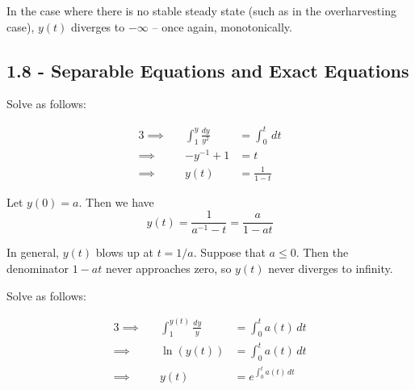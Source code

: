 \documentclass[a4paper]{article}
\begin{document}
In the case where there is no stable steady state (such as in the overharvesting case), \(y \!\left( t \right) \) diverges to \(-\infty\) -- once again, monotonically. 

\newpage
\subsection{\textsf{1.8 - Separable Equations and Exact Equations}}

Solve as follows:

\begin{alignat*}{3}
	\implies &&\int^{y}_{1} \frac{dy}{y^{2}} & = \int^{t}_{0}  \, dt  \\
	\implies && -y^{-1} + 1 & = t \\ 
	\implies && y \!\left( t \right) & = \frac{1}{1 - t}
\end{alignat*}


Let \(y \!\left( 0 \right) = a\). Then we have
\[
	y \!\left( t \right) = \frac{1}{a^{-1} - t} = \frac{a}{1 - at}
\]

In general, \(y \!\left( t \right) \) blows up at \(t = 1/a\). Suppose that \(a \le 0\). Then the denominator \(1 - at\) never approaches zero, so \(y \!\left( t \right) \) never diverges to infinity.

\vspace{12pt}


Solve as follows:

\begin{alignat*}{3}
	\implies &&\int^{y \!\left( t \right) }_{1} \frac{dy}{y} & = \int^{t}_{0} a \!\left( t \right)  \, dt  \\
	\implies && \ln\left( y \!\left( t \right)  \right) & = \int^{t}_{0} a \!\left( t \right)  \, dt  \\ 
	\implies && y \!\left( t \right) & = e^{\int^{t}_{0} a \!\left( t \right)  \, dt }
\end{alignat*}
\end{document}
